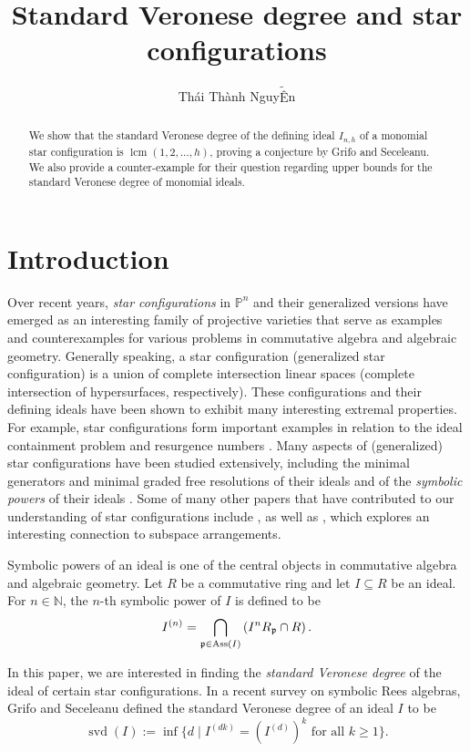 \documentclass[12pt]{amsart}
\title{Standard Veronese degree and star configurations}
\author{Th\'ai Th\`anh Nguy$\tilde{\text{\^E}}$n}
\numberwithin{equation}{section}
\theoremstyle{definition}
\DeclareMathOperator{\Ass}{Ass}
\DeclareMathOperator{\lcm}{lcm}
\DeclareMathOperator{\svd}{svd}
\newcommand{\PP}{{\mathbb P}}
\newcommand{\NN}{{\mathbb N}}
\def\pp{{\frak p}}
\begin{document}
\begin{abstract}
We show that the standard Veronese degree of the defining ideal $I_{n,h}$ of a monomial star configuration is $\lcm(1,2,\ldots,h)$, proving a conjecture by Grifo and Seceleanu. We also provide a counter-example for their question regarding upper bounds for the standard Veronese degree of monomial ideals.
\end{abstract}

\maketitle

\section{Introduction}

Over recent years, \textit{star configurations} in $\PP^n$ and their generalized versions have emerged as an interesting family of projective varieties that serve as examples and counterexamples for various problems in commutative algebra and algebraic geometry. Generally speaking, a star configuration (generalized star configuration) is a union of complete intersection linear spaces (complete intersection of hypersurfaces, respectively). These configurations and their defining ideals have been shown to exhibit many interesting extremal properties. For example, star configurations form important examples in relation to the ideal containment problem and resurgence numbers \cite{BoH, bghn2022demailly}. Many aspects of (generalized) star configurations have been studied extensively, including the minimal generators and minimal graded free resolutions of their ideals \cite{GHM2013,PS2015, Galetto20} and of the \textit{symbolic powers} of their ideals \cite{Mantero, LinShen}. Some of many other papers that have contributed to our understanding of star configurations include \cite{WaldschmidtSpecialConfig, CGVT2015, AGT2017}, as well as \cite{Toh2017}, which explores an interesting connection to subspace arrangements. 

Symbolic powers of an ideal is one of the central objects in commutative algebra and algebraic geometry. Let $R$ be a commutative ring and let $I \subseteq R$ be an ideal. For $n \in \NN$, the $n$-th symbolic power of $I$ is defined to be
 	$$I^{(n)} = \bigcap_{\pp \in \Ass(I)} \left(I^nR_\pp \cap R\right).$$

In this paper, we are interested in finding the \textit{standard Veronese degree} of the ideal of certain star configurations. In a recent survey \cite{symbolicReesSurvey} on symbolic Rees algebras, Grifo and Seceleanu defined the standard Veronese degree of an ideal $I$ to be 
$$\svd(I):= \inf \{ d \mid I^{(dk)}=(I^{(d)})^k \text{  for all  } k\ge 1 \}.$$
\end{document}
